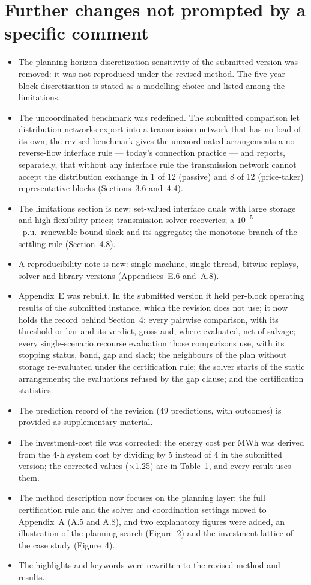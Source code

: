 \documentclass[11pt]{article}
\begin{document}
\section*{Further changes not prompted by a specific comment}

\begin{itemize}[leftmargin=*]
  \item The planning-horizon discretization sensitivity of the submitted version was removed: it was not reproduced under the revised method. The five-year block discretization is stated as a modelling choice and listed among the limitations.
  \item The uncoordinated benchmark was redefined. The submitted comparison let distribution networks export into a transmission network that has no load of its own; the revised benchmark gives the uncoordinated arrangements a no-reverse-flow interface rule --- today's connection practice --- and reports, separately, that without any interface rule the transmission network cannot accept the distribution exchange in 1 of 12 (passive) and 8 of 12 (price-taker) representative blocks (Sections~3.6 and~4.4).
  \item The limitations section is new: set-valued interface duals with large storage and high flexibility prices; transmission solver recoveries; a $10^{-5}$~p.u.\ renewable bound slack and its aggregate; the monotone branch of the settling rule (Section~4.8).
  \item A reproducibility note is new: single machine, single thread, bitwise replays, solver and library versions (Appendices~E.6 and~A.8).
  \item Appendix~E was rebuilt. In the submitted version it held per-block operating results of the submitted instance, which the revision does not use; it now holds the record behind Section~4: every pairwise comparison, with its threshold or bar and its verdict, gross and, where evaluated, net of salvage; every single-scenario recourse evaluation those comparisons use, with its stopping status, band, gap and slack; the neighbours of the plan without storage re-evaluated under the certification rule; the solver starts of the static arrangements; the evaluations refused by the gap clause; and the certification statistics.
  \item The prediction record of the revision (49 predictions, with outcomes) is provided as supplementary material.
  \item The investment-cost file was corrected: the energy cost per MWh was derived from the 4-h system cost by dividing by 5 instead of 4 in the submitted version; the corrected values (×1.25) are in Table~1, and every result uses them.
  \item The method description now focuses on the planning layer: the full certification rule and the solver and coordination settings moved to Appendix~A (A.5 and A.8), and two explanatory figures were added, an illustration of the planning search (Figure~2) and the investment lattice of the case study (Figure~4).
  \item The highlights and keywords were rewritten to the revised method and results.
\end{itemize}
\end{document}
